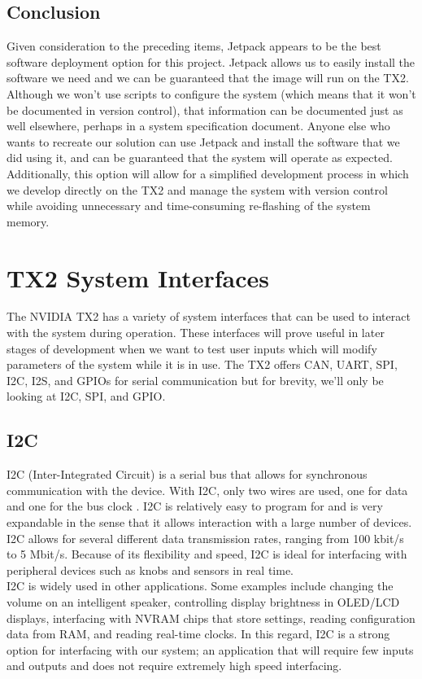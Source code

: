 \subsection{Conclusion}
Given consideration to the preceding items, Jetpack appears to be the best software deployment option for this project. Jetpack allows us to easily install the software we need and we can be guaranteed that the image will run on the TX2. Although we won't use scripts to configure the system (which means that it won't be documented in version control), that information can be documented just as well elsewhere, perhaps in a system specification document. Anyone else who wants to recreate our solution can use Jetpack and install the software that we did using it, and can be guaranteed that the system will operate as expected. Additionally, this option will allow for a simplified development process in which we develop directly on the TX2 and manage the system with version control while avoiding unnecessary and time-consuming re-flashing of the system memory.

\newpage
\section{TX2 System Interfaces}
The NVIDIA TX2 has a variety of system interfaces that can be used to interact with the system during operation. These interfaces will prove useful in later stages of development when we want to test user inputs which will modify parameters of the system while it is in use. The TX2 offers CAN, UART, SPI, I2C, I2S, and GPIOs for serial communication but for brevity, we'll only be looking at I2C, SPI, and GPIO.

\subsection{I2C}
I2C (Inter-Integrated Circuit) is a serial bus that allows for synchronous communication with the device. With I2C, only two wires are used, one for data and one for the bus clock \cite{i2cBus}. I2C is relatively easy to program for and is very expandable in the sense that it allows interaction with a large number of devices. I2C allows for several different data transmission rates, ranging from 100 kbit/s to 5 Mbit/s. Because of its flexibility and speed, I2C is ideal for interfacing with peripheral devices such as knobs and sensors in real time. \\

I2C is widely used in other applications. Some examples include changing the volume on an intelligent speaker, controlling display brightness in OLED/LCD displays, interfacing with NVRAM chips that store settings, reading configuration data from RAM, and reading real-time clocks. In this regard, I2C is a strong option for interfacing with our system; an application that will require few inputs and outputs and does not require extremely high speed interfacing.

